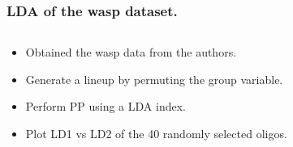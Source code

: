 \documentclass{beamer}
\begin{document}
\begin{frame}
	\frametitle{LDA of the wasp dataset.}
	\begin{columns}
		\begin{column}{0.4\textwidth}
		  \begin{itemize}
		  	\item Obtained the wasp data from the authors.
			  \item Generate a lineup by permuting the group variable.  
			  \item Perform PP using a LDA index.
			\item Plot LD1 vs LD2 of the 40 randomly selected oligos. 
		  \end{itemize}		
			
		\end{column}
		
		\begin{column}{0.6\textwidth}
			 \begin{center}  \end{center}
		\end{column}
	\end{columns}  

\end{frame}
\end{document}
